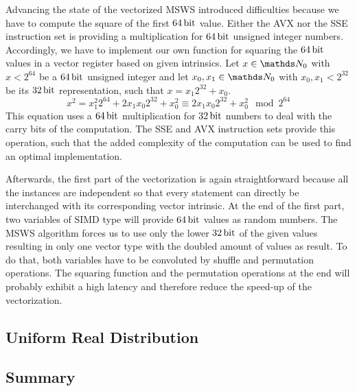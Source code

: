 \documentclass{stdlocal}
\begin{document}
    Advancing the state of the vectorized MSWS introduced difficulties because we have to compute the square of the first $64\, \mathrm{bit}$ value.
    Either the AVX nor the SSE instruction set is providing a multiplication for $64\, \mathrm{bit}$ unsigned integer numbers.
    Accordingly, we have to implement our own function for squaring the $64\, \mathrm{bit}$ values in a vector register based on given intrinsics.
    Let $x\in\setNatural_0$ with $x < 2^{64}$ be a $64\, \mathrm{bit}$ unsigned integer and let $x_0,x_1\in\setNatural_0$ with $x_0,x_1 < 2^{32}$ be its $32\, \mathrm{bit}$ representation, such that $x = x_1 2^{32} + x_0$.
    \[
      x^2 = x_1^2 2^{64} + 2x_1x_0 2^{32} + x_0^2 \equiv 2x_1x_0 2^{32} + x_0^2 \mod 2^{64}
    \]
    This equation uses a $64\, \mathrm{bit}$ multiplication for $32\, \mathrm{bit}$ numbers to deal with the carry bits of the computation.
    The SSE and AVX instruction sets provide this operation, such that the added complexity of the computation can be used to find an optimal implementation.

    Afterwards, the first part of the vectorization is again straightforward because all the instances are independent so that every statement can directly be interchanged with its corresponding vector intrinsic.
    At the end of the first part, two variables of SIMD type will provide $64\, \mathrm{bit}$ values as random numbers.
    The MSWS algorithm forces us to use only the lower $32\, \mathrm{bit}$ of the given values resulting in only one vector type with the doubled amount of values as result.
    To do that, both variables have to be convoluted by shuffle and permutation operations.
    The squaring function and the permutation operations at the end will probably exhibit a high latency and therefore reduce the speed-up of the vectorization.



  \subsection{Uniform Real Distribution} %
  \label{sub:uniform_real_distribution}

  \subsection{Summary} %
  \label{sub:summary}

\end{document}
